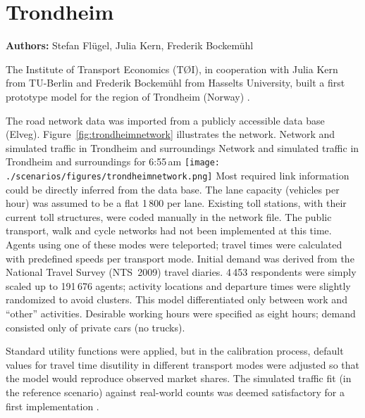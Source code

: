 \chapter{Trondheim}
\label{ch:trondheim}
\hfill \textbf{Authors:} Stefan Flügel, Julia Kern, Frederik Bockemühl


The Institute of Transport Economics (TØI), in cooperation with Julia Kern from TU-Berlin and Frederik Bockemühl from Hasselts University, built a first prototype model for the region of Trondheim (Norway) \citep[][]{FluegelKern_unpub_WTS_2014}.

The road network data was imported from a publicly accessible data base (Elveg). Figure~\ref{fig:trondheimnetwork} illustrates the network. 
%
\createfigure%
{Network and simulated traffic in Trondheim and surroundings}%
{Network and simulated traffic in Trondheim and surroundings for 6:55\,am \citep[source][]{FluegelEtAl_Samferdsel_2014}}%
{\label{fig:trondheimnetwork}}%
{\texttt{[image: ./scenarios/figures/trondheimnetwork.png]}}%
{}
%
Most required link information could be directly inferred from the data base. The lane capacity (vehicles per hour) was assumed to be a flat 1\,800 per lane. Existing toll stations, with their current toll structures, were coded manually in the network file. The public transport, walk and cycle networks had not been implemented at this time. Agents using one of these modes were teleported; travel times were calculated with predefined speeds per transport mode. 
Initial demand was derived from the National Travel Survey (NTS~2009) travel diaries. 4\,453 respondents were simply scaled up to 191\,676 agents; activity locations and departure times were slightly randomized to avoid clusters. This model differentiated only between work and ``other'' activities. Desirable working hours were specified as eight hours; demand consisted only of private cars (no trucks). 

Standard utility functions were applied, but in the calibration process, default values for travel time disutility in different transport modes were adjusted so that the model would reproduce observed market shares. The simulated traffic fit (in the reference scenario) against real-world counts was deemed satisfactory for a first implementation \citep[][]{Bockemuehl_TechRep_UH_2014}. 

